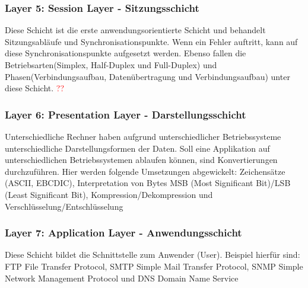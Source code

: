 \documentclass[12pt,a4paper]{article}
\begin{document}
			\subsubsection{Layer 5: Session Layer - Sitzungsschicht}
				Diese Schicht ist die erste anwendungsorientierte Schicht und behandelt Sitzungsabläufe und Synchronisationspunkte. Wenn ein Fehler auftritt, kann auf diese Synchronisationspunkte aufgesetzt werden. Ebenso fallen die Betriebsarten(Simplex, Half-Duplex und Full-Duplex) und Phasen(Verbindungsaufbau, Datenübertragung und Verbindungsaufbau) unter diese Schicht. \textcolor{red}{??}

			\subsubsection{Layer 6: Presentation Layer - Darstellungsschicht}
				Unterschiedliche Rechner haben aufgrund unterschiedlicher Betriebssysteme unterschiedliche Darstellungsformen der Daten. Soll eine Applikation auf unterschiedlichen Betriebssystemen ablaufen können, sind Konvertierungen durchzuführen.
				Hier werden folgende Umsetzungen abgewickelt:\newline
				Zeichensätze (ASCII, EBCDIC), Interpretation von Bytes MSB (Most Significant Bit)/LSB (Least Significant Bit), Kompression/Dekompression und Verschlüsselung/Entschlüsselung

			\subsubsection{Layer 7: Application Layer - Anwendungsschicht}
			Diese Schicht bildet die Schnittstelle zum Anwender (User). Beispiel hierfür sind:\newline
			FTP File Transfer Protocol, SMTP Simple Mail Transfer Protocol, SNMP Simple Network Management Protocol und DNS Domain Name Service
\end{document}
